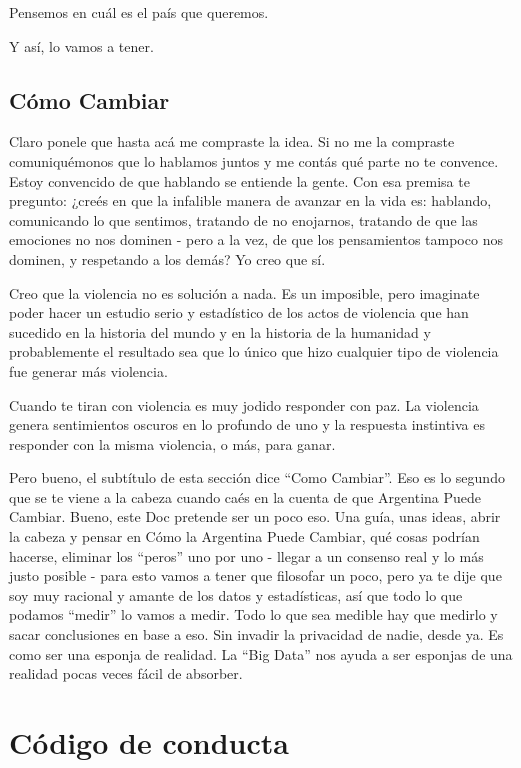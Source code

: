 \documentclass[
]{book}
\begin{document}
Pensemos en cuál es el país que queremos.

Y así, lo vamos a tener.

\hypertarget{cuxf3mo-cambiar}{%
\section{Cómo Cambiar}\label{cuxf3mo-cambiar}}

Claro ponele que hasta acá me compraste la idea. Si no me la compraste comuniquémonos que lo hablamos juntos y me contás qué parte no te convence. Estoy convencido de que hablando se entiende la gente. Con esa premisa te pregunto: ¿creés en que la infalible manera de avanzar en la vida es: hablando, comunicando lo que sentimos, tratando de no enojarnos, tratando de que las emociones no nos dominen - pero a la vez, de que los pensamientos tampoco nos dominen, y respetando a los demás? Yo creo que sí.

Creo que la violencia no es solución a nada. Es un imposible, pero imaginate poder hacer un estudio serio y estadístico de los actos de violencia que han sucedido en la historia del mundo y en la historia de la humanidad y probablemente el resultado sea que lo único que hizo cualquier tipo de violencia fue generar más violencia.

Cuando te tiran con violencia es muy jodido responder con paz. La violencia genera sentimientos oscuros en lo profundo de uno y la respuesta instintiva es responder con la misma violencia, o más, para ganar.

Pero bueno, el subtítulo de esta sección dice ``Como Cambiar''. Eso es lo segundo que se te viene a la cabeza cuando caés en la cuenta de que Argentina Puede Cambiar. Bueno, este Doc pretende ser un poco eso. Una guía, unas ideas, abrir la cabeza y pensar en Cómo la Argentina Puede Cambiar, qué cosas podrían hacerse, eliminar los ``peros'' uno por uno - llegar a un consenso real y lo más justo posible - para esto vamos a tener que filosofar un poco, pero ya te dije que soy muy racional y amante de los datos y estadísticas, así que todo lo que podamos ``medir'' lo vamos a medir. Todo lo que sea medible hay que medirlo y sacar conclusiones en base a eso. Sin invadir la privacidad de nadie, desde ya. Es como ser una esponja de realidad. La ``Big Data'' nos ayuda a ser esponjas de una realidad pocas veces fácil de absorber.

\hypertarget{appendix-apuxe9ndice}{%
\appendix}


\hypertarget{codigo-de-conducta}{%
\chapter{Código de conducta}\label{codigo-de-conducta}}
\end{document}
